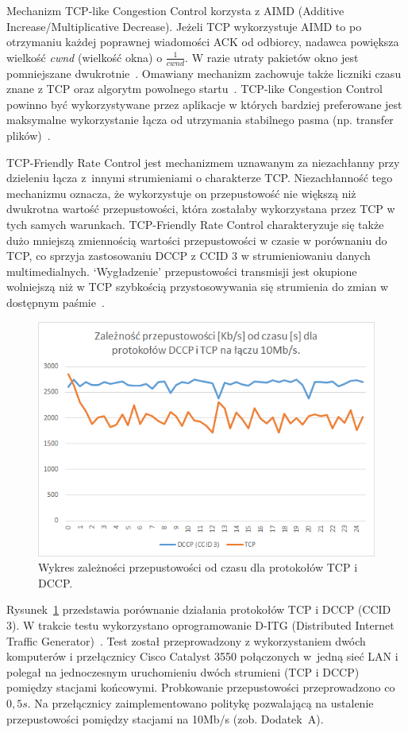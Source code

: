 Mechanizm TCP-like Congestion Control korzysta z AIMD (Additive Increase/Multiplicative Decrease). Jeżeli TCP wykorzystuje AIMD to po otrzymaniu każdej poprawnej wiadomości ACK od odbiorcy, nadawca powiększa wielkość \textit{cwnd} (wielkość okna) o $\frac{1}{cwnd}$. W razie utraty pakietów okno jest pomniejszane dwukrotnie~\cite{Stevens}. Omawiany mechanizm zachowuje także liczniki czasu znane z TCP oraz algorytm powolnego startu~\cite{RFC2581}. TCP-like Congestion Control powinno być wykorzystywane przez aplikacje w których bardziej preferowane jest maksymalne wykorzystanie łącza od utrzymania stabilnego pasma (np. transfer plików)~\cite{RFC4341}.

TCP-Friendly Rate Control jest mechanizmem uznawanym za niezachłanny przy dzieleniu łącza z~innymi strumieniami o charakterze TCP. Niezachłanność tego mechanizmu oznacza, że wykorzystuje on przepustowość nie większą niż dwukrotna wartość przepustowości, która zostałaby wykorzystana przez TCP w tych samych warunkach. TCP-Friendly Rate Control charakteryzuje się także dużo mniejszą zmiennością wartości przepustowości w czasie w porównaniu do TCP, co sprzyja zastosowaniu DCCP z CCID 3 w strumieniowaniu danych multimedialnych. `Wygładzenie' przepustowości transmisji jest okupione wolniejszą niż w TCP szybkością przystosowywania się strumienia do zmian w dostępnym paśmie~\cite{RFC5348}.


\begin{figure}[h!]
	\centering
		\includegraphics{TCP_DCCP}
	\caption{Wykres zależności przepustowości od czasu dla protokołów TCP i DCCP.}
	\label{TCP_DCCP}
\end{figure}

Rysunek~\ref{TCP_DCCP} przedstawia porównanie działania protokołów TCP i DCCP (CCID 3). W trakcie testu wykorzystano oprogramowanie D-ITG (Distributed Internet Traffic Generator)~\cite{D-ITG}. Test został przeprowadzony z wykorzystaniem dwóch komputerów i przełącznicy Cisco Catalyst 3550 połączonych w~jedną sieć LAN i polegał na jednoczesnym uruchomieniu dwóch strumieni (TCP i DCCP) pomiędzy stacjami końcowymi. Probkowanie przepustowości przeprowadzono co $0,5s$. Na przełącznicy zaimplementowano politykę pozwalającą na ustalenie przepustowości pomiędzy stacjami na 10Mb/s (zob. Dodatek~A).

